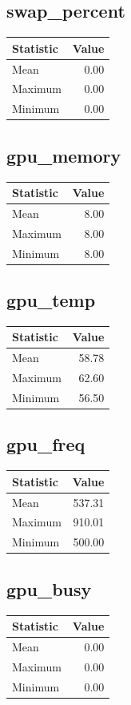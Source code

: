\documentclass[11pt]{article}
\begin{document}
\subsection{swap_percent}
\begin{tabular}{lr}
\toprule
Statistic & Value \\
\midrule
Mean & 0.00 \\
Maximum & 0.00 \\
Minimum & 0.00 \\
\bottomrule
\end{tabular}


\subsection{gpu_memory}
\begin{tabular}{lr}
\toprule
Statistic & Value \\
\midrule
Mean & 8.00 \\
Maximum & 8.00 \\
Minimum & 8.00 \\
\bottomrule
\end{tabular}


\subsection{gpu_temp}
\begin{tabular}{lr}
\toprule
Statistic & Value \\
\midrule
Mean & 58.78 \\
Maximum & 62.60 \\
Minimum & 56.50 \\
\bottomrule
\end{tabular}


\subsection{gpu_freq}
\begin{tabular}{lr}
\toprule
Statistic & Value \\
\midrule
Mean & 537.31 \\
Maximum & 910.01 \\
Minimum & 500.00 \\
\bottomrule
\end{tabular}


\subsection{gpu_busy}
\begin{tabular}{lr}
\toprule
Statistic & Value \\
\midrule
Mean & 0.00 \\
Maximum & 0.00 \\
Minimum & 0.00 \\
\bottomrule
\end{tabular}
\end{document}

